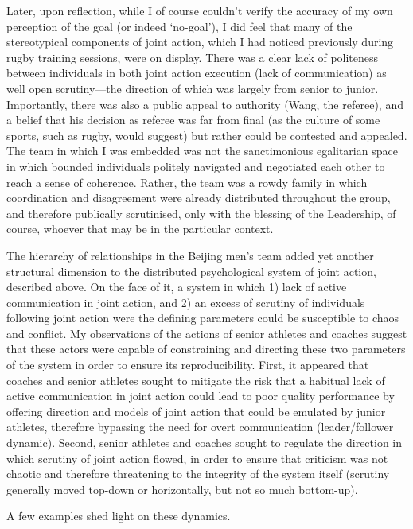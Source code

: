 \begin{CJK}{UTF8}{gbsn}
Later, upon reflection, while I of course couldn't verify the accuracy of my own perception of the goal (or indeed `no-goal'), I did feel that many of the stereotypical components of joint action, which I had noticed previously during rugby training sessions, were on display.  There was a clear lack of politeness between individuals in both joint action execution (lack of communication) as well open scrutiny---the direction of which was largely from senior to junior.  Importantly, there was also a public appeal to authority (Wang, the referee), and a belief that his decision as referee was far from final (as the culture of some sports, such as rugby, would suggest) but rather could be contested and appealed.  The team in which I was embedded was not the sanctimonious egalitarian space in which bounded individuals politely navigated and negotiated each other to reach a sense of coherence.  Rather, the team was a rowdy family in which coordination and disagreement were already distributed throughout the group, and therefore publically scrutinised, only with the blessing of the Leadership, of course, whoever that may be in the particular context.


The hierarchy of relationships in the Beijing men's team added yet another structural dimension to the distributed psychological system of joint action, described above. On the face of it, a system in which 1) lack of active communication in joint action, and 2) an excess of scrutiny of individuals following joint action were the defining parameters could be susceptible to chaos and conflict.  My observations of the actions of senior athletes and coaches suggest that these actors were capable of constraining and directing these two parameters of the system in order to ensure its reproducibility.   First, it appeared that coaches and senior athletes sought to mitigate the risk that a habitual lack of active communication in joint action could lead to poor quality performance by offering direction and models of joint action that could be emulated by junior athletes, therefore bypassing the need for overt communication (leader/follower dynamic). Second, senior athletes and coaches sought to regulate the direction in which scrutiny of joint action flowed, in order to  ensure that criticism was not chaotic and therefore threatening to the integrity of the system itself (scrutiny generally moved top-down or horizontally, but not so much bottom-up).

A few examples shed light on these dynamics.


\end{CJK}
